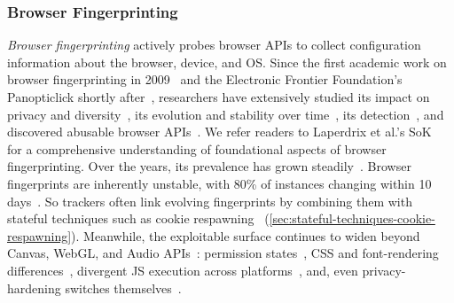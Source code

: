 \subsubsection{Browser Fingerprinting} 
\label{sec:stateless-techniques-browser-fingperinting}

\textit{Browser fingerprinting} actively probes browser APIs to collect configuration information about the browser, device, and OS.
%
Since the first academic work on browser fingerprinting in 2009~\cite{mayerAnyPersonPamphleteer2009} and the Electronic Frontier Foundation's Panopticlick shortly after~\cite{eckersleyHowUniqueYour2010}, researchers have extensively studied its impact on privacy and diversity~\cite{laperdrixBeautyBeastDiverting2016,gomez-boixHidingCrowdAnalysis2018}, its evolution and stability over time~\cite{vastelFPSTALKERTrackingBrowser2018}, its detection~\cite{suAutomaticDiscoveryEmerging2023,nomoto2023browser}, and discovered abusable browser APIs~\cite{olejnikLeakingBatteryPrivacy2016,dasWebsSixthSense2018,linFashionFauxPas2023,huygheFPRainbowFingerprintBasedBrowser2025}.
%
We refer readers to Laperdrix et al.'s SoK~\cite{laperdrix2020browser} for a comprehensive understanding of foundational aspects of browser fingerprinting.
%
%
Over the years, its prevalence has grown steadily~\cite{nikiforakisCookielessMonsterExploring2013,acarFPDetectiveDustingWeb2013,englehardtOnlineTracking1millionsite2016,iqbalFingerprintingFingerprintersLearning2021}. 
%
%
Browser fingerprints are inherently unstable, with 80\% of instances changing within 10 days~\cite{vastelFPSTALKERTrackingBrowser2018,liWhoTouchedMy2020}. 
%
So trackers often link evolving fingerprints by combining them with stateful techniques such as cookie respawning~\cite{fouadMyCookiePhoenix2022} (\autoref{sec:stateful-techniques-cookie-respawning}). %
%
Meanwhile, the exploitable surface continues to widen beyond Canvas, WebGL, and Audio APIs~\cite{chaliseYourSpeakerMy2022}: permission states~\cite{nomoto2023browser}, CSS and font-rendering differences~\cite{linFashionFauxPas2023}, divergent JS execution across platforms~\cite{zafarSameScriptDifferent2025}, and, even privacy-hardening switches themselves~\cite{huygheFPRainbowFingerprintBasedBrowser2025}.
